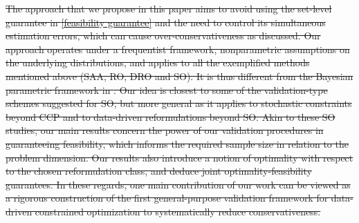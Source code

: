 \documentclass[mnsc,blindrev]{informs4} %
\begin{document}
\sout{The approach that we propose in this paper aims to avoid using the set-level guarantee in \eqref{feasibility guarantee} and the need to control its simultaneous estimation errors, which can cause over-conservativeness as discussed. Our approach operates under a frequentist framework, nonparametric assumptions on the underlying distributions, and applies to all the exemplified methods mentioned above (SAA, RO, DRO and SO). It is thus different from the Bayesian parametric framework in \cite{gupta2019near}. Our idea is closest to some of the validation-type schemes suggested for SO, but more general as it applies to stochastic constraints beyond CCP and to data-driven reformulations beyond SO. Akin to these SO studies, our main results concern the power of our validation procedures in guaranteeing feasibility, which informs the required sample size in relation to the problem dimension. Our results also introduce a notion of optimality with respect to the chosen reformulation class, and deduce joint optimality-feasibility guarantees. In these regards, one main contribution of our work can be viewed as a rigorous construction of the first general-purpose validation framework for data-driven constrained optimization to systematically reduce conservativeness.}
\end{document}
